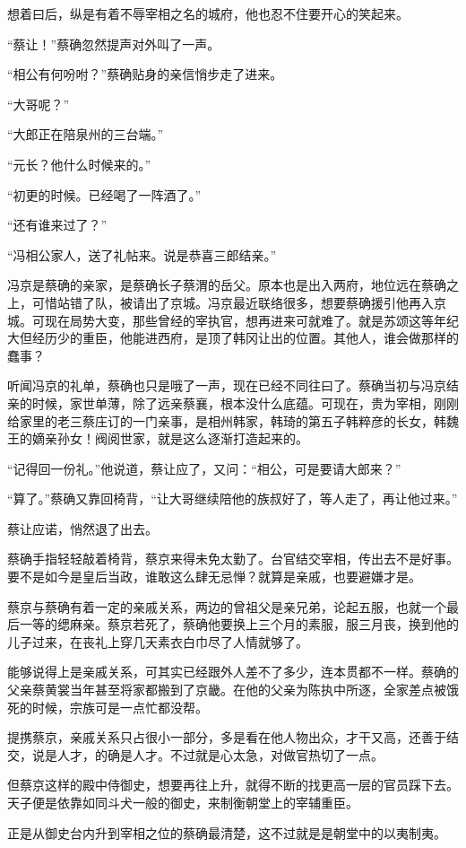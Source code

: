 想着曰后，纵是有着不辱宰相之名的城府，他也忍不住要开心的笑起来。

“蔡让！”蔡确忽然提声对外叫了一声。

“相公有何吩咐？”蔡确贴身的亲信悄步走了进来。

“大哥呢？”

“大郎正在陪泉州的三台端。”

“元长？他什么时候来的。”

“初更的时候。已经喝了一阵酒了。”

“还有谁来过了？”

“冯相公家人，送了礼帖来。说是恭喜三郎结亲。”

冯京是蔡确的亲家，是蔡确长子蔡渭的岳父。原本也是出入两府，地位远在蔡确之上，可惜站错了队，被请出了京城。冯京最近联络很多，想要蔡确援引他再入京城。可现在局势大变，那些曾经的宰执官，想再进来可就难了。就是苏颂这等年纪大但经历少的重臣，他能进西府，是顶了韩冈让出的位置。其他人，谁会做那样的蠢事？

听闻冯京的礼单，蔡确也只是哦了一声，现在已经不同往曰了。蔡确当初与冯京结亲的时候，家世单薄，除了远亲蔡襄，根本没什么底蕴。可现在，贵为宰相，刚刚给家里的老三蔡庄订的一门亲事，是相州韩家，韩琦的第五子韩粹彦的长女，韩魏王的嫡亲孙女！阀阅世家，就是这么逐渐打造起来的。

“记得回一份礼。”他说道，蔡让应了，又问：“相公，可是要请大郎来？”

“算了。”蔡确又靠回椅背，“让大哥继续陪他的族叔好了，等人走了，再让他过来。”

蔡让应诺，悄然退了出去。

蔡确手指轻轻敲着椅背，蔡京来得未免太勤了。台官结交宰相，传出去不是好事。要不是如今是皇后当政，谁敢这么肆无忌惮？就算是亲戚，也要避嫌才是。

蔡京与蔡确有着一定的亲戚关系，两边的曾祖父是亲兄弟，论起五服，也就一个最后一等的缌麻亲。蔡京若死了，蔡确他要换上三个月的素服，服三月丧，换到他的儿子过来，在丧礼上穿几天素衣白巾尽了人情就够了。

能够说得上是亲戚关系，可其实已经跟外人差不了多少，连本贯都不一样。蔡确的父亲蔡黄裳当年甚至将家都搬到了京畿。在他的父亲为陈执中所逐，全家差点被饿死的时候，宗族可是一点忙都没帮。

提携蔡京，亲戚关系只占很小一部分，多是看在他人物出众，才干又高，还善于结交，说是人才，的确是人才。不过就是心太急，对做官热切了一点。

但蔡京这样的殿中侍御史，想要再往上升，就得不断的找更高一层的官员踩下去。天子便是依靠如同斗犬一般的御史，来制衡朝堂上的宰辅重臣。

正是从御史台内升到宰相之位的蔡确最清楚，这不过就是是朝堂中的以夷制夷。

